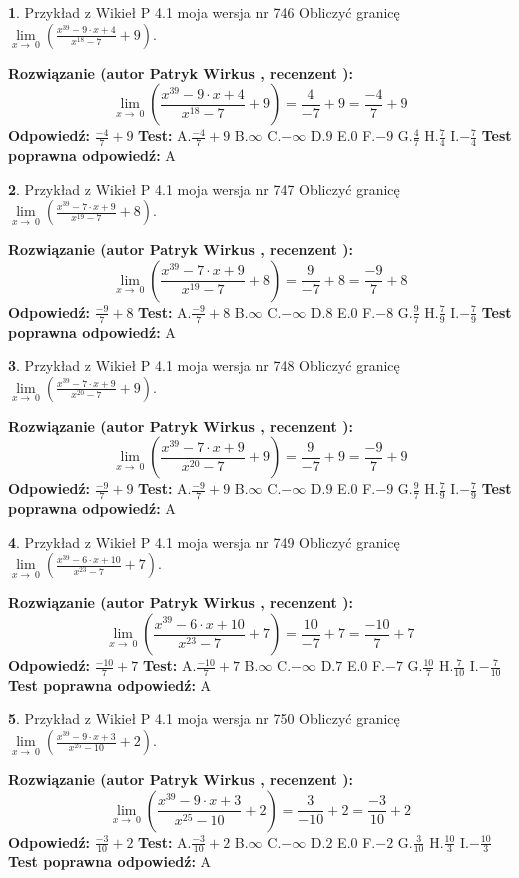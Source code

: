 \documentclass[12pt, a4paper]{article}
\theoremstyle{definition} %
\newtheorem{zad}{}
\newcommand{\zadStart}[1]{\begin{zad}#1\newline}
\newcommand{\zadStop}{\end{zad}}
\newcommand{\rozwStart}[2]{\noindent \textbf{Rozwiązanie (autor #1 , recenzent #2): }\newline}
\newcommand{\rozwStop}{\newline}
\newcommand{\odpStart}{\noindent \textbf{Odpowiedź:}\newline}
\newcommand{\odpStop}{\newline}
\newcommand{\testStart}{\noindent \textbf{Test:}\newline}
\newcommand{\testStop}{\newline}
\newcommand{\kluczStart}{\noindent \textbf{Test poprawna odpowiedź:}\newline}
\newcommand{\kluczStop}{\newline}
\begin{document}
\zadStart{Przykład z Wikieł P 4.1 moja wersja nr 746}
Obliczyć granicę $\lim\limits_{x\to\ 0}(\frac{x^{39}-9 \cdot x +4}{x^{18}-7}+9)$.
\zadStop
\rozwStart{Patryk Wirkus}{}
$$\lim\limits_{x\to\ 0}(\frac{x^{39}-9 \cdot x +4}{x^{18}-7}+9)=\frac{4}{-7}+9=\frac{-4}{7}+9$$
\rozwStop
\odpStart
$\frac{-4}{7}+9$
\odpStop
\testStart
A.$\frac{-4}{7}+9$
B.$\infty$
C.$-\infty$
D.$9$
E.$0$
F.$-9$
G.$\frac{4}{7}$
H.$\frac{7}{4}$
I.$-\frac{7}{4}$
\testStop
\kluczStart
A
\kluczStop



\zadStart{Przykład z Wikieł P 4.1 moja wersja nr 747}
Obliczyć granicę $\lim\limits_{x\to\ 0}(\frac{x^{39}-7 \cdot x +9}{x^{19}-7}+8)$.
\zadStop
\rozwStart{Patryk Wirkus}{}
$$\lim\limits_{x\to\ 0}(\frac{x^{39}-7 \cdot x +9}{x^{19}-7}+8)=\frac{9}{-7}+8=\frac{-9}{7}+8$$
\rozwStop
\odpStart
$\frac{-9}{7}+8$
\odpStop
\testStart
A.$\frac{-9}{7}+8$
B.$\infty$
C.$-\infty$
D.$8$
E.$0$
F.$-8$
G.$\frac{9}{7}$
H.$\frac{7}{9}$
I.$-\frac{7}{9}$
\testStop
\kluczStart
A
\kluczStop



\zadStart{Przykład z Wikieł P 4.1 moja wersja nr 748}
Obliczyć granicę $\lim\limits_{x\to\ 0}(\frac{x^{39}-7 \cdot x +9}{x^{20}-7}+9)$.
\zadStop
\rozwStart{Patryk Wirkus}{}
$$\lim\limits_{x\to\ 0}(\frac{x^{39}-7 \cdot x +9}{x^{20}-7}+9)=\frac{9}{-7}+9=\frac{-9}{7}+9$$
\rozwStop
\odpStart
$\frac{-9}{7}+9$
\odpStop
\testStart
A.$\frac{-9}{7}+9$
B.$\infty$
C.$-\infty$
D.$9$
E.$0$
F.$-9$
G.$\frac{9}{7}$
H.$\frac{7}{9}$
I.$-\frac{7}{9}$
\testStop
\kluczStart
A
\kluczStop



\zadStart{Przykład z Wikieł P 4.1 moja wersja nr 749}
Obliczyć granicę $\lim\limits_{x\to\ 0}(\frac{x^{39}-6 \cdot x +10}{x^{23}-7}+7)$.
\zadStop
\rozwStart{Patryk Wirkus}{}
$$\lim\limits_{x\to\ 0}(\frac{x^{39}-6 \cdot x +10}{x^{23}-7}+7)=\frac{10}{-7}+7=\frac{-10}{7}+7$$
\rozwStop
\odpStart
$\frac{-10}{7}+7$
\odpStop
\testStart
A.$\frac{-10}{7}+7$
B.$\infty$
C.$-\infty$
D.$7$
E.$0$
F.$-7$
G.$\frac{10}{7}$
H.$\frac{7}{10}$
I.$-\frac{7}{10}$
\testStop
\kluczStart
A
\kluczStop



\zadStart{Przykład z Wikieł P 4.1 moja wersja nr 750}
Obliczyć granicę $\lim\limits_{x\to\ 0}(\frac{x^{39}-9 \cdot x +3}{x^{25}-10}+2)$.
\zadStop
\rozwStart{Patryk Wirkus}{}
$$\lim\limits_{x\to\ 0}(\frac{x^{39}-9 \cdot x +3}{x^{25}-10}+2)=\frac{3}{-10}+2=\frac{-3}{10}+2$$
\rozwStop
\odpStart
$\frac{-3}{10}+2$
\odpStop
\testStart
A.$\frac{-3}{10}+2$
B.$\infty$
C.$-\infty$
D.$2$
E.$0$
F.$-2$
G.$\frac{3}{10}$
H.$\frac{10}{3}$
I.$-\frac{10}{3}$
\testStop
\kluczStart
A
\kluczStop
\end{document}
